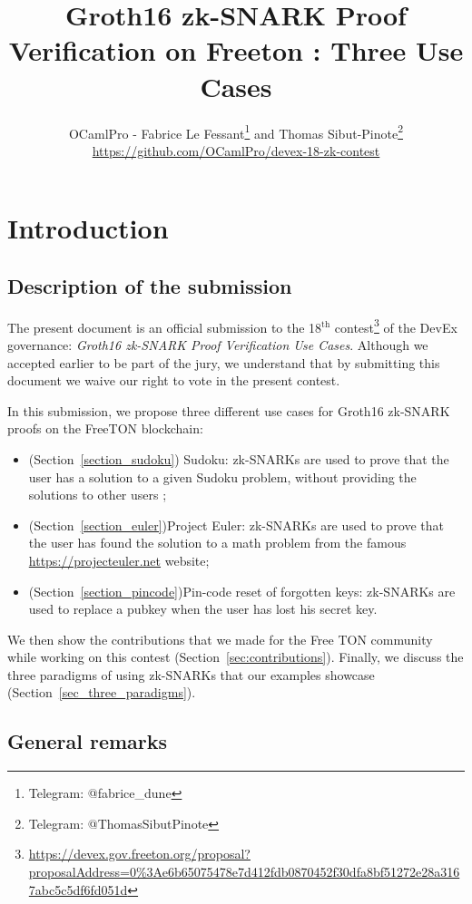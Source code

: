 \documentclass[10pt,a4paper]{article}
\author{OCamlPro - Fabrice Le Fessant\footnote{Telegram: @fabrice\_dune} and Thomas Sibut-Pinote\footnote{Telegram: @ThomasSibutPinote} \\ \small{\url{https://github.com/OCamlPro/devex-18-zk-contest}}}
\title{Groth16 zk-SNARK Proof Verification on Freeton : Three Use Cases}
\date{}
\begin{document}
\maketitle

\newcommand{\zksnark}{zk-SNARK}
\newcommand{\zksnarks}{zk-SNARKs}


\section{Introduction}
\label{sec:intro}

\subsection{Description of the submission}
\label{subsec:description}

The present document is an official submission to the 18$^{\text{th}}$
contest\footnote{\url{https://devex.gov.freeton.org/proposal?proposalAddress=0\%3Ae6b65075478e7d412fdb0870452f30dfa8bf51272e28a3167abc5c5df6fd051d}}
of the DevEx governance: {\em Groth16 \zksnark{} Proof Verification Use
  Cases}. Although we accepted earlier to be part of the jury, we
understand that by submitting this document we waive our right to vote
in the present contest.

In this submission, we propose three different use cases for Groth16
\zksnark{} proofs on the FreeTON blockchain:
\begin{itemize}
\item (Section~\ref{section_sudoku}) Sudoku: \zksnarks{} are used to prove that the user has a solution
  to a given Sudoku problem, without providing the solutions to other
  users ;
\item (Section~\ref{section_euler})Project Euler: \zksnarks{} are used to prove that the user has found the solution to a math problem from the famous \url{https://projecteuler.net} website;
\item (Section~\ref{section_pincode})Pin-code reset of forgotten keys: \zksnarks{} are used to replace a
  pubkey when the user has lost his secret key.
\end{itemize}

We then show the contributions that we made for the Free TON community while working on
this contest (Section~\ref{sec:contributions}). Finally, we discuss the three paradigms of using \zksnarks{} that our examples showcase (Section~\ref{sec_three_paradigms}).

\subsection{General remarks}
\label{subsec:general_remarks}
\end{document}
